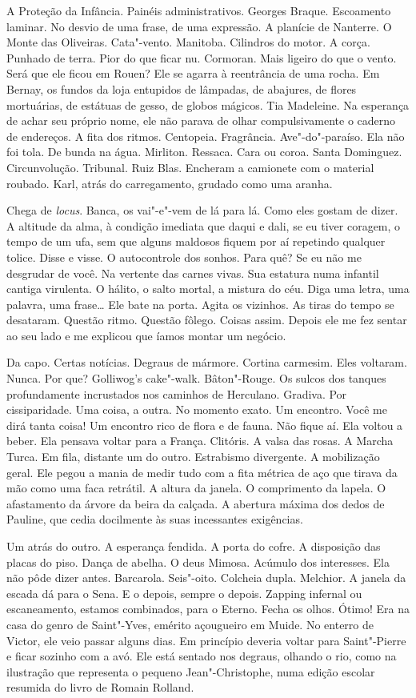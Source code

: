 A Proteção da Infância. Painéis administrativos. Georges Braque.
Escoamento laminar. No desvio de uma frase, de uma expressão. A planície
de Nanterre. O Monte das Oliveiras. Cata"-vento. Manitoba. Cilindros do
motor. A corça. Punhado de terra. Pior do que ficar nu. Cormoran. Mais
ligeiro do que o vento. Será que ele ficou em Rouen? Ele se agarra à
reentrância de uma rocha. Em Bernay, os fundos da loja entupidos de
lâmpadas, de abajures, de flores mortuárias, de estátuas de gesso, de
globos mágicos. Tia Madeleine. Na esperança de achar seu próprio nome,
ele não parava de olhar compulsivamente o caderno de endereços. A fita
dos ritmos. Centopeia. Fragrância. Ave"-do"-paraíso. Ela não foi tola. De
bunda na água. Mirliton. Ressaca. Cara ou coroa. Santa Dominguez.
Circunvolução. Tribunal. Ruiz Blas. Encheram a camionete com o material
roubado. Karl, atrás do carregamento, grudado como uma aranha.

Chega de \emph{locus}. Banca, os vai"-e"-vem de lá para lá. Como eles
gostam de dizer. A altitude da alma, à condição imediata que daqui e
dali, se eu tiver coragem, o tempo de um ufa, sem que alguns maldosos
fiquem por aí repetindo qualquer tolice. Disse e visse. O autocontrole
dos sonhos. Para quê? Se eu não me desgrudar de você. Na vertente das
carnes vivas. Sua estatura numa infantil cantiga virulenta. O hálito, o
salto mortal, a mistura do céu. Diga uma letra, uma palavra, uma
frase\ldots{} Ele bate na porta. Agita os vizinhos. As tiras do tempo se
desataram. Questão ritmo. Questão fôlego. Coisas assim. Depois ele me
fez sentar ao seu lado e me explicou que íamos montar um negócio.

Da capo. Certas notícias. Degraus de mármore. Cortina carmesim. Eles
voltaram. Nunca. Por que? Golliwog's cake"-walk. Bâton"-Rouge. Os sulcos
dos tanques profundamente incrustados nos caminhos de Herculano.
Gradiva. Por cissiparidade. Uma coisa, a outra. No momento exato. Um
encontro. Você me dirá tanta coisa! Um encontro rico de flora e de
fauna. Não fique aí. Ela voltou a beber. Ela pensava voltar para a
França. Clitóris. A valsa das rosas. A Marcha Turca. Em fila, distante
um do outro. Estrabismo divergente. A mobilização geral. Ele pegou a
mania de medir tudo com a fita métrica de aço que tirava da mão como uma
faca retrátil. A altura da janela. O comprimento da lapela. O
afastamento da árvore da beira da calçada. A abertura máxima dos dedos
de Pauline, que cedia docilmente às suas incessantes exigências.

Um atrás do outro. A esperança fendida. A porta do cofre. A disposição
das placas do piso. Dança de abelha. O deus Mimosa. Acúmulo dos
interesses. Ela não pôde dizer antes. Barcarola. Seis"-oito. Colcheia
dupla. Melchior. A janela da escada dá para o Sena. E o depois, sempre o
depois. Zapping infernal ou escaneamento, estamos combinados, para o
Eterno. Fecha os olhos. Ótimo! Era na casa do genro de Saint"-Yves,
emérito açougueiro em Muide. No enterro de Victor, ele veio passar
alguns dias. Em princípio deveria voltar para Saint"-Pierre e ficar
sozinho com a avó. Ele está sentado nos degraus, olhando o rio, como na
ilustração que representa o pequeno Jean"-Christophe, numa edição escolar
resumida do livro de Romain Rolland.

